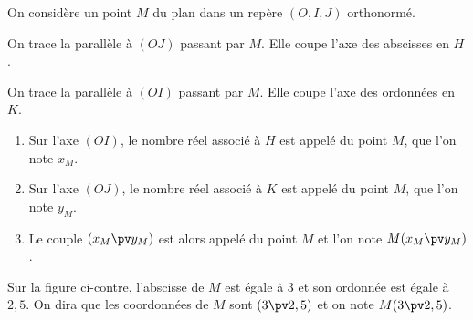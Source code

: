 \documentclass[10pt,openright,twoside,french]{book}
\begin{document}
On considère un point $M$ du plan dans un repère $(O,I,J)$ orthonormé.\par
On trace la parallèle à $(OJ)$ passant par $M$. Elle coupe l'axe des abscisses en $H$.\par
On trace la parallèle à $(OI)$ passant par $M$. Elle coupe l'axe des ordonnées en $K$.\medskip

\begin{Defi}
    \begin{enumerate}
        \item Sur l'axe $(OI)$, le nombre réel associé à $H$ est appelé  du point $M$, que l'on note $x_M$.
        \item Sur l'axe $(OJ)$, le nombre réel associé à $K$ est appelé  du point $M$, que l'on note $y_M$.
        \item Le couple $(x_M \pv y_M)$ est alors appelé  du point $M$ et l'on note $M(x_M \pv y_M)$.
    \end{enumerate}
\end{Defi}\clearpage

\begin{Exemple}
\strut\par
\begin{minipage}{0.5\linewidth}
    Sur la figure ci-contre, l'abscisse de $M$ est égale à $3$ et son ordonnée est égale à $2,5$. On dira que les coordonnées de $M$ sont $(3 \pv 2,5)$ et on note $M(3 \pv 2,5)$.
\end{minipage}\quad
\begin{minipage}{0.4\linewidth}
\begin{center}
    \end{center}
\end{minipage}
\end{Exemple}
\end{document}
